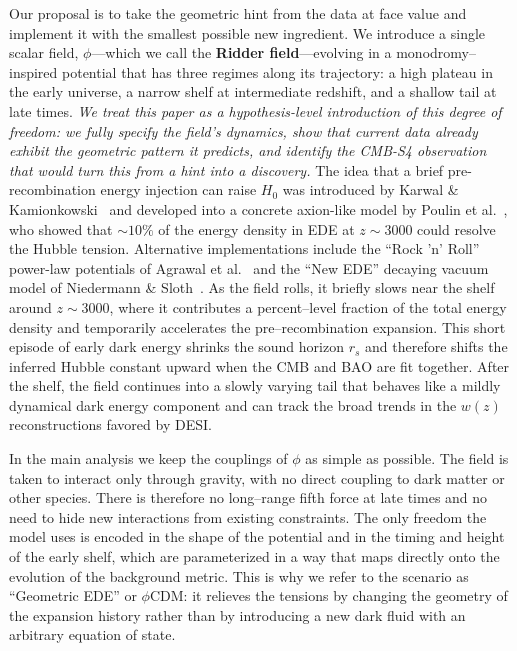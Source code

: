 \documentclass[a4paper,11pt]{article}
\begin{document}
Our proposal is to take the geometric hint from the data at face value and implement it with the smallest possible new ingredient. We introduce a single scalar field, $\phi$---which we call the \textbf{Ridder field}---evolving in a monodromy--inspired potential that has three regimes along its trajectory: a high plateau in the early universe, a narrow shelf at intermediate redshift, and a shallow tail at late times. \textit{We treat this paper as a hypothesis-level introduction of this degree of freedom: we fully specify the field's dynamics, show that current data already exhibit the geometric pattern it predicts, and identify the CMB-S4 observation that would turn this from a hint into a discovery.} The idea that a brief pre-recombination energy injection can raise $H_0$ was introduced by Karwal \& Kamionkowski~\cite{Karwal_Kamionkowski} and developed into a concrete axion-like model by Poulin et al.~\cite{Poulin_EDE}, who showed that $\sim 10\%$ of the energy density in EDE at $z \sim 3000$ could resolve the Hubble tension. Alternative implementations include the ``Rock 'n' Roll'' power-law potentials of Agrawal et al.~\cite{Agrawal_RnR} and the ``New EDE'' decaying vacuum model of Niedermann \& Sloth~\cite{Niedermann_NewEDE}. As the field rolls, it briefly slows near the shelf around $z \sim 3000$, where it contributes a percent--level fraction of the total energy density and temporarily accelerates the pre--recombination expansion. This short episode of early dark energy shrinks the sound horizon $r_s$ and therefore shifts the inferred Hubble constant upward when the CMB and BAO are fit together. After the shelf, the field continues into a slowly varying tail that behaves like a mildly dynamical dark energy component and can track the broad trends in the $w(z)$ reconstructions favored by DESI.

In the main analysis we keep the couplings of $\phi$ as simple as possible. The field is taken to interact only through gravity, with no direct coupling to dark matter or other species. There is therefore no long--range fifth force at late times and no need to hide new interactions from existing constraints. The only freedom the model uses is encoded in the shape of the potential and in the timing and height of the early shelf, which are parameterized in a way that maps directly onto the evolution of the background metric. This is why we refer to the scenario as ``Geometric EDE'' or $\phi$CDM: it relieves the tensions by changing the geometry of the expansion history rather than by introducing a new dark fluid with an arbitrary equation of state.
\end{document}
